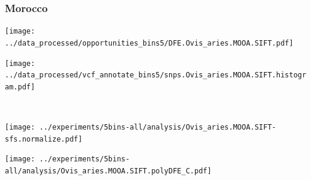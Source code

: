 \subsubsection{Morocco}

\begin{minipage}{0.49\linewidth}
    \texttt{[image: ../data\_processed/opportunities\_bins5/DFE.Ovis\_aries.MOOA.SIFT.pdf]}
\end{minipage}
\begin{minipage}{0.49\linewidth}
    \texttt{[image: ../data\_processed/vcf\_annotate\_bins5/snps.Ovis\_aries.MOOA.SIFT.histogram.pdf]}
\end{minipage}
\\
\begin{minipage}{0.49\linewidth}
    \texttt{[image: ../experiments/5bins-all/analysis/Ovis\_aries.MOOA.SIFT-sfs.normalize.pdf]}
\end{minipage}
\begin{minipage}{0.49\linewidth}
    \texttt{[image: ../experiments/5bins-all/analysis/Ovis\_aries.MOOA.SIFT.polyDFE\_C.pdf]}
\end{minipage}
\\ 
